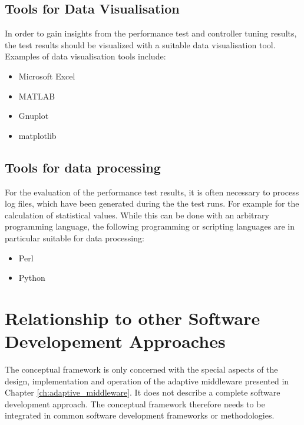 \subsection{Tools for Data Visualisation}

In order to gain insights from the performance test  and controller tuning results, the test results should be visualized with a suitable data visualisation tool. Examples of data visualisation tools include:

\begin{itemize}
	\item Microsoft Excel \citep{excel}
	\item MATLAB \citep{matlab}
	\item Gnuplot \citep{gnuplot}
	\item matplotlib \citep{matplotlib}
\end{itemize}

\subsection{Tools for data processing}

For the evaluation of the performance test results, it is often necessary to process log files, which have been generated during the the test runs. For example for the calculation of statistical values. While this can be done with an arbitrary programming language, the following programming or scripting languages are in particular suitable for data processing:

\begin{itemize}
	\item Perl \citep{perl}
	\item Python \citep{python}
\end{itemize}


\section{Relationship to other Software Developement Approaches} 
\label{sec:ch6_other_frameworks}

The conceptual framework is only concerned with the special aspects of the design, implementation and operation of the adaptive middleware presented in Chapter \ref{ch:adaptive_middleware}. It does not describe a complete software development approach. The conceptual framework therefore needs to be integrated in common software development frameworks or methodologies.

